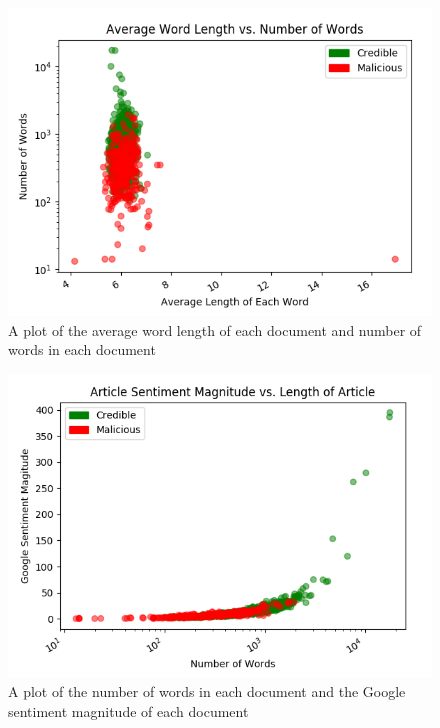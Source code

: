 \begin{figure}[h!]
\centering
\captionsetup{justification=centering,width=0.95\textwidth}
\centerline{\includegraphics[scale=0.65]{wordlenNumWordsLogScale.png}}
\caption[Average Word Length vs Number of Words]{
    A plot of the average word length of each document and number of words in each document
}
\label{fig:wordlenNumWordsLogScale}
\end{figure}


\begin{figure}[h!]
\centering
\captionsetup{justification=centering,width=0.95\textwidth}
\centerline{\includegraphics[scale=0.65]{sentimentMagnitudeArticleLen.png}}
\caption[Number of Words vs Google Sentiment Magnitude]{
    A plot of the number of words in each document and the Google sentiment magnitude of each document
}
\label{fig:numWordsToSentimentMagnitude}
\end{figure}


